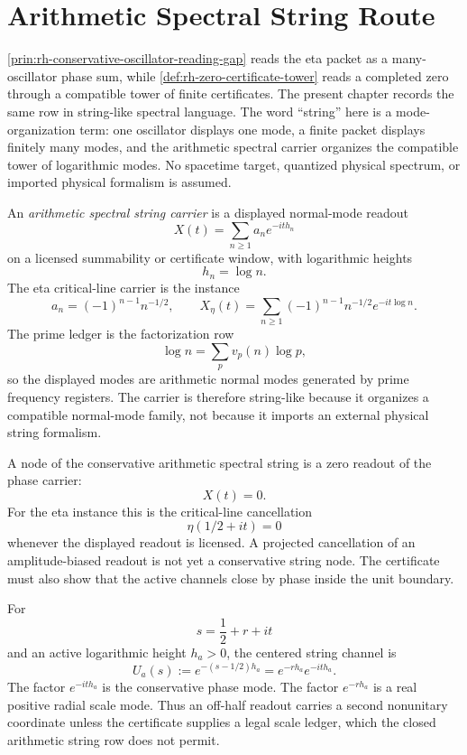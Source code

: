\chapter{Arithmetic Spectral String Route}
\label{ch:visions-rh-arithmetic-spectral-string-route}

\autoref{prin:rh-conservative-oscillator-reading-gap} reads the eta
packet as a many-oscillator phase sum, while
\autoref{def:rh-zero-certificate-tower} reads a completed zero through a
compatible tower of finite certificates. The present chapter records the
same row in string-like spectral language. The word ``string'' here is a
mode-organization term: one oscillator displays one mode, a finite packet
displays finitely many modes, and the arithmetic spectral carrier
organizes the compatible tower of logarithmic modes. No spacetime
target, quantized physical spectrum, or imported physical formalism is
assumed.

\begin{definition}
\label{def:rh-arithmetic-spectral-string-carrier}
An \emph{arithmetic spectral string carrier} is a displayed normal-mode
readout
$$
X(t)=\sum_{n\ge1}a_n e^{-it h_n}
$$
on a licensed summability or certificate window, with logarithmic
heights
$$
h_n=\log n.
$$
The eta critical-line carrier is the instance
$$
a_n=(-1)^{n-1}n^{-1/2},
\qquad
X_{\eta}(t)=\sum_{n\ge1}(-1)^{n-1}n^{-1/2}e^{-it\log n}.
$$
The prime ledger is the factorization row
$$
\log n=\sum_p v_p(n)\log p,
$$
so the displayed modes are arithmetic normal modes generated by prime
frequency registers. The carrier is therefore string-like because it
organizes a compatible normal-mode family, not because it imports an
external physical string formalism.
\end{definition}

\begin{principle}
\label{prin:rh-string-nodes-phase-cancellations}
A node of the conservative arithmetic spectral string is a zero readout
of the phase carrier:
$$
X(t)=0.
$$
For the eta instance this is the critical-line cancellation
$$
\eta(1/2+it)=0
$$
whenever the displayed readout is licensed. A projected cancellation of
an amplitude-biased readout is not yet a conservative string node. The
certificate must also show that the active channels close by phase
inside the unit boundary.
\end{principle}

\begin{definition}
\label{def:rh-centered-string-channel}
For
$$
s=\frac12+r+it
$$
and an active logarithmic height $h_a>0$, the centered string channel is
$$
U_a(s):=e^{-(s-1/2)h_a}
=
e^{-r h_a}e^{-it h_a}.
$$
The factor $e^{-it h_a}$ is the conservative phase mode. The factor
$e^{-r h_a}$ is a real positive radial scale mode. Thus an off-half
readout carries a second nonunitary coordinate unless the certificate
supplies a legal scale ledger, which the closed arithmetic string row
does not permit.
\end{definition}

